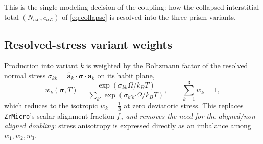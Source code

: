 \documentclass[11pt]{article}
\newcommand{\sig}{\bm{\sigma}}
\newcommand{\Oh}{\Omega}
\newcommand{\kb}{k_{B}}
\newcommand{\Lcal}{\mathcal{L}}
\newcommand{\ZrMicro}{\texttt{ZrMicro}}
\begin{document}
This is the single modeling decision of the coupling: how the collapsed
interstitial total $(N_{a\Lcal},c_{a\Lcal})$ of \eqref{eq:collapse} is resolved
into the three prism variants.

\subsection{Resolved-stress variant weights}

Production into variant $k$ is weighted by the Boltzmann factor of the resolved
normal stress $\sigma_{kk}=\hat{\mathbf a}_k\cdot\sig\cdot\hat{\mathbf a}_k$ on
its habit plane,
\begin{equation}
\label{eq:variant_weight}
    w_k(\sig,T)
    =
    \frac{\exp(\sigma_{kk}\Oh/\kb T)}{\sum_{k'}\exp(\sigma_{k'k'}\Oh/\kb T)},
    \qquad \sum_{k=1}^{3} w_k = 1,
\end{equation}
which reduces to the isotropic $w_k=\tfrac13$ at zero deviatoric stress. This
replaces \ZrMicro{}'s scalar alignment fraction $f_a$ \emph{and removes the need
for the aligned/non-aligned doubling}: stress anisotropy is expressed directly as
an imbalance among $w_1,w_2,w_3$.
\end{document}
